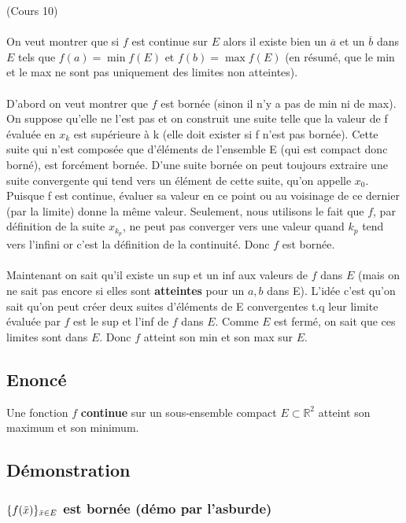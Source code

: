 \documentclass{article}
\begin{document}
(Cours 10)\\\\
On veut montrer que si $f$ est continue sur $E$ alors il existe bien un $\overline{a}$ et un $\overline{b}$ dans $E$ tels que $f(a) = \min f(E)$ et $f(b) = \max f(E)$ (en résumé, que le min et le max ne sont pas uniquement des limites non atteintes).\\\\
D'abord on veut montrer que $f$ est bornée (sinon il n'y a pas de min ni de max). On suppose qu'elle ne l'est pas et on construit une suite telle que la valeur de f évaluée en $x_k$ est supérieure à k (elle doit exister si f n'est pas bornée). Cette suite qui n'est composée que d'éléments de l'ensemble E (qui est compact donc borné), est forcément bornée. D'une suite bornée on peut toujours extraire une suite convergente qui tend vers un élément de cette suite, qu'on appelle $x_0$. Puisque f est continue, évaluer sa valeur en ce point ou au voisinage de ce dernier (par la limite) donne la même valeur. Seulement, nous utilisons le fait que $f$, par définition de la suite $x_{k_p}$, ne peut pas converger vers une valeur quand $k_p$ tend vers l'infini or c'est la définition de la continuité. Donc $f$ est bornée.\\\\
Maintenant on sait qu'il existe un sup et un inf aux valeurs de $f$ dans $E$ (mais on ne sait pas encore si elles sont \textbf{atteintes} pour un $a, b$ dans E). L'idée c'est qu'on sait qu'on peut créer deux suites d'éléments de E convergentes t.q leur limite évaluée par $f$ est le sup et l'inf de $f$ dans $E$. Comme $E$ est fermé, on sait que ces limites sont dans $E$. Donc $f$ atteint son min et son max sur $E$.

\subsection{Enoncé}

Une fonction $ f $ \textbf{continue} sur un sous-ensemble compact $ E \subset \mathbb{R}^2 $ atteint son maximum et son minimum.

\subsection{Démonstration}

\subsubsection{$ \{f(\Bar{x})\}_{\Bar{x} \in E} $ est bornée (démo par l'asburde)}
\end{document}
